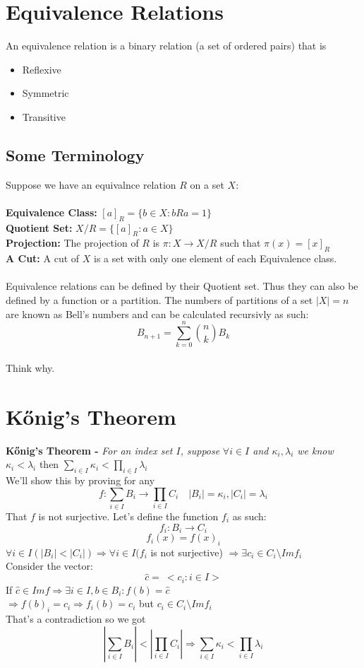 \documentclass{article}
\begin{document}
		
\newpage
	\section{Equivalence Relations}
	An equivalence relation is a binary relation (a set of ordered pairs) that is
	\begin{itemize}
	\item Reflexive
	\item Symmetric
	\item Transitive
	\end{itemize}
	
	\subsection{Some Terminology}
		Suppose we have an equivalnce relation $R$ on a set $X$:\\\\
		\textbf{Equivalence Class:} $[a]_R = \{b\in X:bRa=1\}$\\
		\textbf{Quotient Set:} $X/R = \{[a]_R:a\in X\}$\\
		\textbf{Projection:} The projection of $R$ is $\pi:X\rightarrow X/R$ such that $\pi(x)=[x]_R$\\
		\textbf{A Cut:} A cut of $X$ is a set with only one element of each Equivalence class.\\\\
		Equivalence relations can be defined by their Quotient set.
Thus they can also be defined by a function or a partition.
		The numbers of partitions of a set $|X|=n$ are known as Bell's numbers and can be calculated recursivly as such: $$B_{n+1}=\sum_{k=0}^{n}{n\choose k}B_k$$\\
		Think why.
		
\newpage
\section{Kőnig's Theorem}
	\textbf{Kőnig's Theorem - } \emph{For an index set $I$, suppose$\,\,\forall i\in I$ and $\kappa_i,\lambda_i$ we know $\kappa_i<\lambda_i$} then $\sum_{i\in I}\kappa_i<\prod_{i\in I}\lambda_i$\\
	We'll show this by proving for any
	\[f:\sum_{i\in I}B_i\rightarrow \prod_{i\in I}C_i \quad |B_i|=\kappa_i, |C_i|=\lambda_i\]
	That $f$ is not surjective.
	Let's define the function $f_i$ as such:
	\[f_i:B_i\rightarrow C_i\]
	\[f_i(x)=f(x)_i\]
	$\forall i\in I(|B_i|<|C_i|)\Rightarrow \forall i\in I(f_i$ is not surjective) $\Rightarrow \exists c_i\in C_i\setminus Imf_i$ \\
	Consider the vector: $$\hat{c} = \ <c_i:i\in I>$$
	If $\hat{c}\in Imf \Rightarrow \exists i\in I,b\in B_i:f(b)=\hat{c}$\\
	$\Rightarrow f(b)_i=c_i \Rightarrow f_i(b)=c_i$ but $c_i\in C_i\setminus Imf_i$\\
	That's a contradiction so we got \[|\sum_{i\in I}B_i|< |\prod_{i\in I}C_i| \Rightarrow \sum_{i\in I}\kappa_i<\prod_{i\in I}\lambda_i\]
\end{document}
